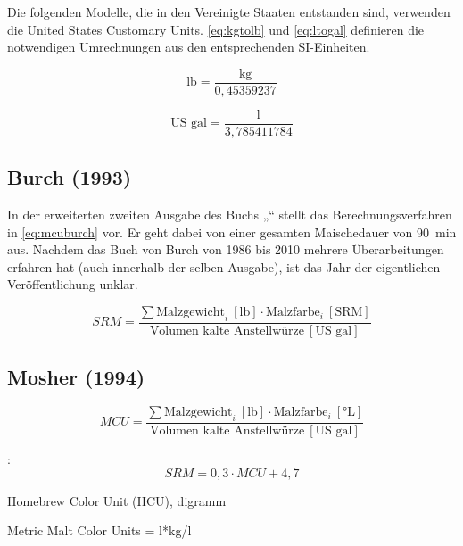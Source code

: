 \documentclass[a4paper,parskip=half]{scrartcl}
\newcommand{\MCUL}{\mathit{MCU}}
\newcommand{\SRM}{\mathit{SRM}}
\newcommand{\ulovi}{\:[\textrm{°L}]}
\newcommand{\usrm}{\:[\textrm{SRM}]}
\newcommand{\ugal}{\:[\textrm{US gal}]}
\newcommand{\ulb}{\:[\textrm{lb}]}
\begin{document}
Die folgenden Modelle, die in den Vereinigte Staaten entstanden sind, verwenden die United States Customary Units. \autoref{eq:kgtolb} und \autoref{eq:ltogal} definieren die notwendigen Umrechnungen aus den entsprechenden SI-Einheiten.

\begin{equation}
\text{lb} = \frac{\text{kg}}{0,45359237}
\label{eq:kgtolb}
\end{equation}

\begin{equation}
\text{US gal} = \frac{\text{l}}{3,785411784}
\label{eq:ltogal}
\end{equation}

\subsection*{Burch (1993)}

In der erweiterten zweiten Ausgabe des Buchs „“ stellt \textcite[102]{Burch2010} das Berechnungsverfahren in \autoref{eq:mcuburch} vor. Er geht dabei von einer gesamten Maischedauer von 90~min aus. Nachdem das Buch von Burch von 1986 bis 2010 mehrere Überarbeitungen erfahren hat (auch innerhalb der selben Ausgabe), ist das Jahr der eigentlichen Veröffentlichung unklar.

\begin{equation}
\SRM = \frac{\sum \text{Malzgewicht}_i \ulb \cdot \text{Malzfarbe}_i \usrm}{\text{Volumen kalte Anstellwürze} \ugal} 
\label{eq:mcuburch}
\end{equation}

\subsection*{Mosher (1994)}

\begin{equation}
\MCUL = \frac{\sum \text{Malzgewicht}_i \ulb \cdot \text{Malzfarbe}_i \ulovi}{\text{Volumen kalte Anstellwürze} \ugal} 
\label{eq:mcubasis}
\end{equation}

\parencite{Morey2004}:
\begin{equation}
\SRM = 0,3 \cdot \MCUL + 4,7
\label{eq:mcumosher}
\end{equation}

Homebrew Color Unit (HCU), digramm
\parencite[34]{Mosher1994}

Metric Malt Color Units = l*kg/l
\parencite[258]{Mosher2015}
\end{document}
